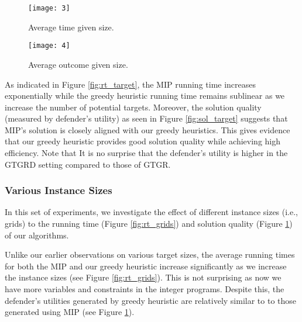 \begin{figure}[!ht]
\begin{center}
\begin{minipage}{0.48\linewidth}
\texttt{[image: 3]}
\caption{Average time given size.}
\label{fig:rt_grids}
\end{minipage}%
\hfill
\begin{minipage}{0.49\linewidth}
\texttt{[image: 4]}
\caption{Average outcome given size.}
\label{fig:sol_grids}
\end{minipage}
\end{center}
\end{figure}

As indicated in Figure \ref{fig:rt_target}, the MIP running time 
increases exponentially while the greedy heuristic running time 
remains sublinear as we increase the number of potential targets. 
Moreover, the solution quality (measured by defender's utility) 
as seen in Figure \ref{fig:sol_target} suggests that 
MIP's solution is closely aligned with our greedy heuristics. 
This gives evidence that our greedy heuristic provides good solution quality 
while achieving high efficiency. 
Note that It is no surprise that the 
defender's utility is higher in the GTGRD setting 
compared to those of GTGR. 

\subsubsection{Various Instance Sizes}
In this set of experiments, we investigate 
the effect of different instance sizes (i.e., grids) 
to the running time (Figure \ref{fig:rt_grids}) 
and solution quality (Figure \ref{fig:sol_grids}) of our algorithms. 

Unlike our earlier observations on various target sizes, 
the average running times for both the MIP and our greedy heuristic 
increase significantly as we increase the instance sizes (see Figure \ref{fig:rt_grids}). 
This is not surprising as now we have more variables 
and constraints in the integer programs. 
Despite this, the defender's utilities generated by greedy heuristic are relatively 
similar to to those generated using MIP (see Figure \ref{fig:sol_grids}). 

